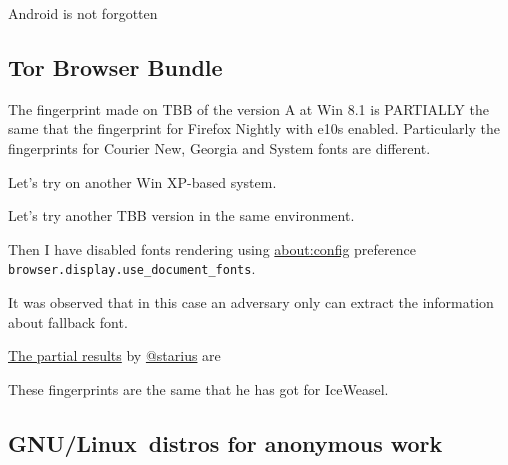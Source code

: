 \documentclass[letterpaper,14pt]{article}
\begin{document}
Android is not forgotten



\subsection{Tor Browser Bundle}\label{tor-browser-bundle}

The fingerprint made on TBB of the version A at Win 8.1 is PARTIALLY the same that the fingerprint for Firefox Nightly with e10s enabled. Particularly the fingerprints for Courier New, Georgia and System fonts are different.



Let's try on another Win XP-based system.



Let's try another TBB version in the same environment.




Then I have disabled fonts rendering using \href{about:config}{\url{about:config}} preference \lstinline!browser.display.use_document_fonts!.




It was observed that in this case an adversary only can extract the information about fallback font.

\href{https://geektimes.ru/post/244484/\#comment_8227810}{The partial results} by \href{https://geektimes.ru/users/starius/}{@starius} are




These fingerprints are the same that he has got for IceWeasel.

\subsection{GNU/Linux\texttrademark\ distros for anonymous work}\label{linux-distros-for-anonymous-work}
\end{document}
